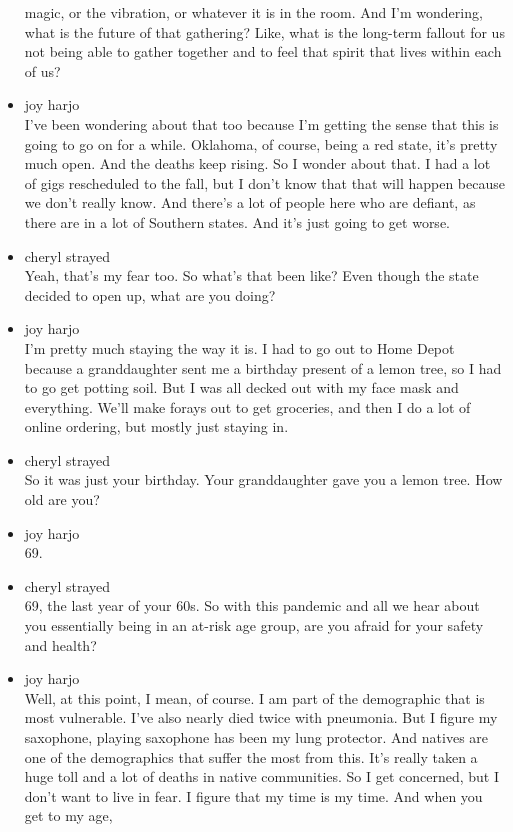 \begin{itemize}
  magic, or the vibration, or whatever it is in the room. And I'm
  wondering, what is the future of that gathering? Like, what is the
  long-term fallout for us not being able to gather together and to feel
  that spirit that lives within each of us?
\item
  joy harjo\\
  I've been wondering about that too because I'm getting the sense that
  this is going to go on for a while. Oklahoma, of course, being a red
  state, it's pretty much open. And the deaths keep rising. So I wonder
  about that. I had a lot of gigs rescheduled to the fall, but I don't
  know that that will happen because we don't really know. And there's a
  lot of people here who are defiant, as there are in a lot of Southern
  states. And it's just going to get worse.
\item
  cheryl strayed\\
  Yeah, that's my fear too. So what's that been like? Even though the
  state decided to open up, what are you doing?
\item
  joy harjo\\
  I'm pretty much staying the way it is. I had to go out to Home Depot
  because a granddaughter sent me a birthday present of a lemon tree, so
  I had to go get potting soil. But I was all decked out with my face
  mask and everything. We'll make forays out to get groceries, and then
  I do a lot of online ordering, but mostly just staying in.
\item
  cheryl strayed\\
  So it was just your birthday. Your granddaughter gave you a lemon
  tree. How old are you?
\item
  joy harjo\\
  69.
\item
  cheryl strayed\\
  69, the last year of your 60s. So with this pandemic and all we hear
  about you essentially being in an at-risk age group, are you afraid
  for your safety and health?
\item
  joy harjo\\
  Well, at this point, I mean, of course. I am part of the demographic
  that is most vulnerable. I've also nearly died twice with pneumonia.
  But I figure my saxophone, playing saxophone has been my lung
  protector. And natives are one of the demographics that suffer the
  most from this. It's really taken a huge toll and a lot of deaths in
  native communities. So I get concerned, but I don't want to live in
  fear. I figure that my time is my time. And when you get to my age,

\end{itemize}
